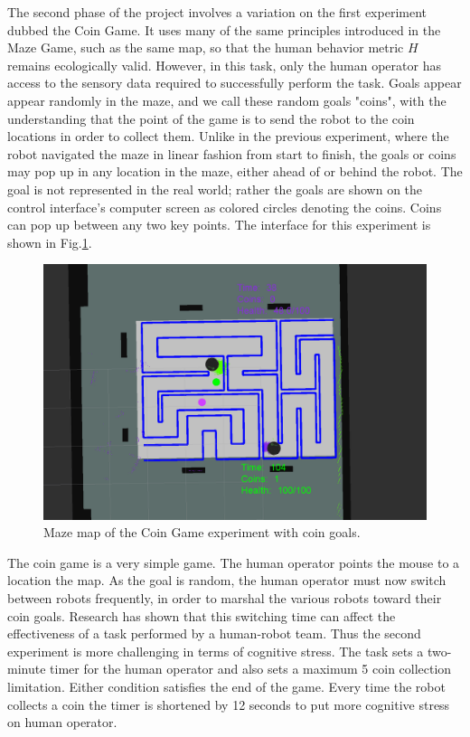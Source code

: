 \documentclass{sig-alternate}
\begin{document}
The second phase of the project involves a variation on the first
experiment dubbed the Coin Game. It uses many of the same principles
introduced in the Maze Game, such as the same map, so that the human
behavior metric $H$ remains ecologically valid.  However, in this
task, only the human operator has access to the sensory data required
to successfully perform the task.  Goals appear appear randomly in the
maze, and we call these random goals "coins", with the understanding
that the point of the game is to send the robot to the coin locations
in order to collect them. Unlike in the previous experiment, where the
robot navigated the maze in linear fashion from start to finish, the
goals or coins may pop up in any location in the maze, either ahead of
or behind the robot.  The goal is not represented in the real world;
rather the goals are shown on the control interface's computer screen
as colored circles denoting the coins. Coins can pop up between any
two key points. The interface for this experiment is shown in
Fig.\ref{fig:coin_map}.

\begin{figure}  
\centering
\includegraphics[width=.5\textwidth]{coin_game_rviz.png}
\caption{Maze map of the Coin Game experiment with coin goals.}
\label{fig:coin_map}
\end{figure}

The coin game is a very simple game. The human operator points the
mouse to a location the map. As the goal is random, the human operator
must now switch between robots frequently, in order to marshal the
various robots toward their coin goals. Research
\cite{olsen2003metrics} has shown that this switching time can affect
the effectiveness of a task performed by a human-robot team. Thus
the second experiment is more challenging in terms of cognitive
stress.  The task sets a two-minute timer for the human operator and
also sets a maximum 5 coin collection limitation. Either condition
satisfies the end of the game. Every time the robot collects a coin
the timer is shortened by 12 seconds to put more cognitive stress on
human operator.
\end{document}
